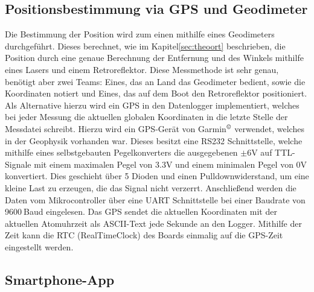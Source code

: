 \documentclass[12pt,a4paper,titlepage,headinclude,bibtotoc]{scrartcl}
\numberwithin{equation}{subsection}
\begin{document}
\subsection{Positionsbestimmung via GPS und Geodimeter}
\label{sec:durchpos}
Die Bestimmung der Position wird zum einen mithilfe eines Geodimeters durchgeführt.
Dieses berechnet, wie im Kapitel\ref{sec:theoort} beschrieben, die Position durch eine genaue Berechnung der Entfernung und des Winkels mithilfe eines Lasers und einem Retroreflektor.
Diese Messmethode ist sehr genau, benötigt aber zwei Teams: Eines, das an Land das Geodimeter bedient, sowie die Koordinaten notiert und Eines, das auf dem Boot den Retroreflektor positioniert.\\
Als Alternative hierzu wird ein GPS in den Datenlogger implementiert, welches bei jeder Messung die aktuellen globalen Koordinaten in die letzte Stelle der Messdatei schreibt.
Hierzu wird ein GPS-Gerät von Garmin$^{\copyright}$ verwendet, welches in der Geophysik vorhanden war.
Dieses besitzt eine RS232 Schnittstelle, welche mithilfe eines selbstgebauten Pegelkonverters die ausgegebenen $\pm6\si{\volt}$ auf TTL-Signale mit einem maximalen Pegel von 3.3\si{\volt} und einem minimalen Pegel von 0\si{\volt} konvertiert.
Dies geschieht über 5 Dioden und einen Pulldownwiderstand, um eine kleine Last zu erzeugen, die das Signal nicht verzerrt.
Anschließend werden die Daten vom Mikrocontroller über eine UART Schnittstelle bei einer Baudrate von 9600$~$Baud eingelesen.
Das GPS sendet die aktuellen Koordinaten mit der aktuellen Atomuhrzeit als ASCII-Text jede Sekunde an den Logger.
Mithilfe der Zeit kann die RTC (RealTimeClock) des Boards einmalig auf die GPS-Zeit eingestellt werden.

\subsection{Smartphone-App}
\label{sec:app}
\end{document}
